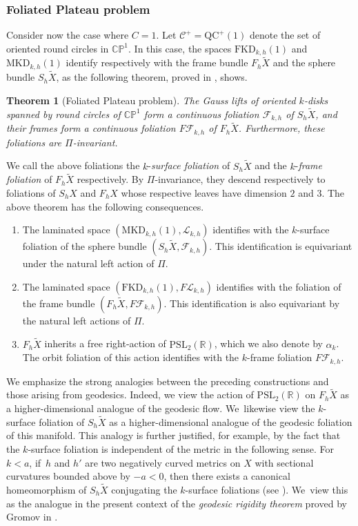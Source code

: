 \documentclass[10pt]{amsart}
\newcommand{\ksurface}{$k$\nobreakdash-surface\xspace}
\newcommand{\kdisks}{$k$\nobreakdash-disks\xspace}
\theoremstyle{plain}
\newtheorem{theorem}{Theorem}[section]
\theoremstyle{definition}
\newcommand\PSL{\mathrm{PSL}_2(\mathbb{R})}
\newcommand\CP{\C\PP^1}
\newcommand{\C}{{\mathbb C}}
\newcommand{\PP}{{\mathbb P}}
\newcommand{\cC}{{\mathcal C}}
\newcommand{\cF}{{\mathcal F}}
\newcommand{\cL}{{\mathcal L}}
\newcommand{\QC}{\mathrm{QC}}
\newcommand{\MKD}{\mathrm{MKD}}
\newcommand{\FKD}{\mathrm{FKD}}
\begin{document}
\subsubsection{Foliated Plateau problem}\label{sss.FPP} Consider now the case where $C=1$. Let $\cC^+=\QC^+(1)$ denote the set of oriented round circles in $\CP$. In this case, the spaces $\FKD_{k,h}(1)$ and $\MKD_{k,h}(1)$ identify respectively with the frame bundle $F_h\tilde{X}$ and the sphere bundle $S_h\tilde{X}$, as the following theorem, proved in \cite[Th.\,2.1.3]{ALS}, shows.

\begin{theorem}[Foliated Plateau problem]\label{th_foliated_Plateau} The Gauss lifts of oriented \kdisks spanned by round circles of $\CP$ form a continuous foliation $\cF_{k,h}$ of $S_h\tilde{X}$, and their frames form a continuous foliation $F\cF_{k,h}$ of $F_h\tilde{X}$. Furthermore, these foliations are $\Pi$-invariant.
\end{theorem}

We call the above foliations the $k$-\emph{surface foliation} of $S_h\tilde{X}$ and the $k$-\emph{frame foliation} of $F_h\tilde{X}$ respectively. By $\Pi$-invariance, they descend respectively to foliations of $S_h X$ and $F_h X$ whose respective leaves have dimension $2$ and $3$. The above theorem has the following consequences.

\begin{enumerate}
\item The laminated space $(\MKD_{k,h}(1),\cL_{k,h})$ identifies with the \ksurface foliation of the sphere bundle $(S_h\tilde{X},\cF_{k,h})$. This identification is equivariant under the natural left action of $\Pi$.
\item The laminated space $(\FKD_{k,h}(1),F\cL_{k,h})$ identifies with the foliation of the frame bundle $(F_h\tilde{X},F\cF_{k,h})$. This identification is also equivariant by the natural left actions of $\Pi$.
\item $F_h\tilde{X}$ inherits a free right-action of $\PSL$, which we also denote by $\alpha_k$. The orbit foliation of this action identifies with the $k$-frame foliation $F\cF_{k,h}$.
\end{enumerate}

We emphasize the strong analogies between the preceding constructions and those arising from geodesics. Indeed, we view the action of $\PSL$ on $F_h\tilde X$ as a higher-dimensional analogue of the geodesic flow. We~likewise view the \ksurface foliation of $S_h\tilde{X}$ as a higher-dimensional analogue of the geodesic foliation of this manifold. This analogy is further justified, for example, by the fact that the \ksurface foliation is independent of the metric in the following sense. For $k<a$, if~$h$ and $h'$ are two negatively curved metrics on $X$ with sectional curvatures bounded above by \hbox{$-a<0$}, then there exists a canonical homeomorphism of $S_h\tilde{X}$ conjugating the \ksurface foliations (see \cite[Th.\,2.1.5.]{ALS}). We~view this as the analogue in the present context of the \emph{geodesic rigidity theorem} proved by Gromov in \cite{Gromov3}.
\end{document}
